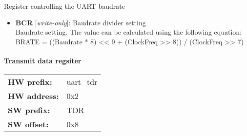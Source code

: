 \vspace{12pt}
Register controlling the UART baudrate

\vspace{12pt}
\noindent
{}

\begin{itemize}
\item \begin{small}
{\bf 
BCR
} [\emph{write-only}]: Baudrate divider setting
\\
Baudrate setting. The value can be calculated using the following equation:\\				 BRATE = ((Baudrate * 8) << 9 + (ClockFreq >> 8)) / (ClockFreq >> 7)
\end{small}
\end{itemize}
\paragraph*{Transmit data regsiter}\vspace{12pt}

\begin{tabular}{l l }
{\bf HW prefix:}  & uart\_tdr\\
{\bf HW address:}  & 0x2\\
{\bf SW prefix:}  & TDR\\
{\bf SW offset:}  & 0x8\\
\end{tabular}


